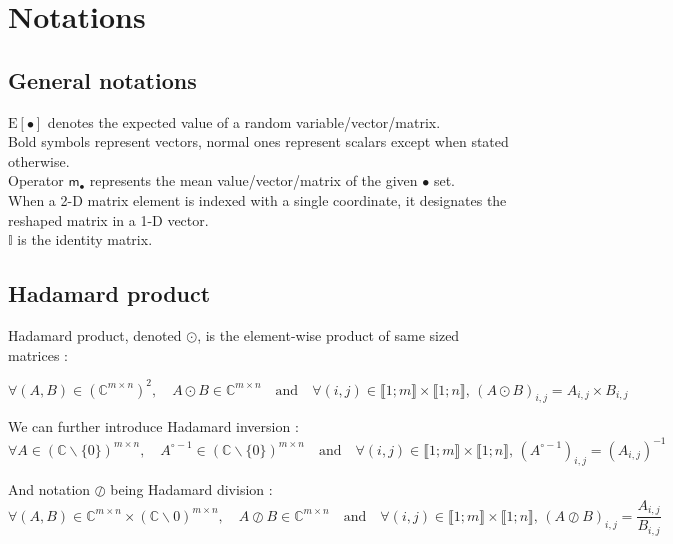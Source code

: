 \documentclass[titlepage]{article}
\newcommand{\hinv}[1]{#1^{\circ-1}} %
\newcommand{\moy}[1]{\boldsymbol{\mathsf{m}}_{#1}}
\renewcommand{\expval}[1]{\text{E}\left[#1\right]}
\begin{document}
	\section{Notations}
	
	\subsection{General notations}
	
	$\expval{\bullet}$ denotes the expected value of a random variable/vector/matrix.\\
	
	Bold symbols represent vectors, normal ones represent scalars except when stated otherwise.\\
	
	Operator $\moy{\bullet}$ represents the mean value/vector/matrix of the given $\bullet$ set.\\
	
	When a 2-D matrix element is indexed with a single coordinate, it designates the reshaped matrix in a 1-D vector.\\
	
	$\mathbb{I}$ is the identity matrix.
	
	
		\subsection{Hadamard product}
	
	Hadamard product, denoted $\odot$, is the element-wise product of same sized matrices :
	
	$$
	\forall (A,B)\in\left(\mathbb{C}^{m\times n}\right)^2, \quad A\odot B\in\mathbb{C}^{m\times n} \quad\text{and}\quad \forall (i,j)\in\llbracket1;m\rrbracket\times\llbracket1;n\rrbracket,\, (A\odot B)_{i,j} = A_{i,j}\times B_{i,j}
	$$
	
	We can further introduce Hadamard inversion :
	$$
	\forall A \in \left(\mathbb{C}\backslash\{0\}\right)^{m\times n},\quad \hinv{A}\in\left(\mathbb{C}\backslash\{0\}\right)^{m\times n} \quad\text{and}\quad \forall (i,j)\in\llbracket1;m\rrbracket\times\llbracket1;n\rrbracket,\, \left(\hinv{A}\right)_{i,j} = \left(A_{i,j}\right)^{-1}
	$$ 
	
	And notation $\oslash$ being Hadamard division :
	$$
	\forall (A,B)\in\mathbb{C}^{m\times n}\times\left(\mathbb{C}\backslash0\right)^{m\times n}, \quad A\oslash B\in\mathbb{C}^{m\times n} \quad\text{and}\quad \forall (i,j)\in\llbracket1;m\rrbracket\times\llbracket1;n\rrbracket,\, (A\oslash B)_{i,j} = \frac{A_{i,j}}{B_{i,j}}
	$$
	
\end{document}
